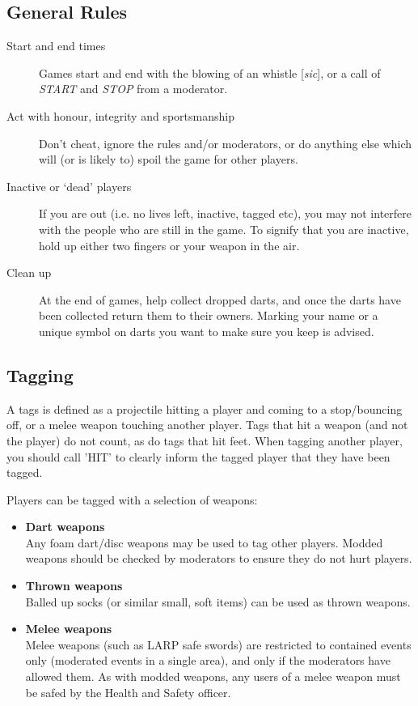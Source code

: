 \documentclass{report}
\newcommand{\itemtitle}[1]{\textbf{#1} \hfill \\}
\begin{document}
	\subsection{General Rules}
	\begin{description}
		\item[Start and end times] Games start and end with the blowing of an whistle [{\em sic}], or a call of {\em START} and {\em STOP} from a moderator.
		\item[Act with honour, integrity and sportsmanship] Don't cheat, ignore the rules and/or moderators, or do anything else which will (or is likely to) spoil the game for other players.
		\item[Inactive or `dead' players] If you are out (i.e. no lives left, inactive, tagged etc), you may not interfere with the people who are still in the game. To signify that you are inactive, hold up either two fingers or your weapon in the air. 
		\item[Clean up] At the end of games, help collect dropped darts, and once the darts have been collected return them to their owners. Marking your name or a unique symbol on darts you want to make sure you keep is advised.
    \end{description}

    \subsection{Tagging}

    A tags is defined as a projectile hitting a player and coming to a stop/bouncing off, or a melee weapon touching another player. Tags that hit a weapon (and not the player) do not count, as do tags that hit feet. When tagging another player, you should call 'HIT' to clearly inform the tagged player that they have been tagged.
    
	Players can be tagged with a selection of weapons:

	\begin{itemize}
		\item \itemtitle{Dart weapons} Any foam dart/disc weapons may be used to tag other players. Modded weapons should be checked by moderators to ensure they do not hurt players.
		\item \itemtitle{Thrown weapons} Balled up socks (or similar small, soft items) can be used as thrown weapons.
    	\item \itemtitle{Melee weapons} Melee weapons (such as LARP safe swords) are restricted to contained events only (moderated events in a single area), and only if the moderators have allowed them. As with modded weapons, any users of a melee weapon must be safed by the Health and Safety officer.
	\end{itemize}
	
\end{document}
